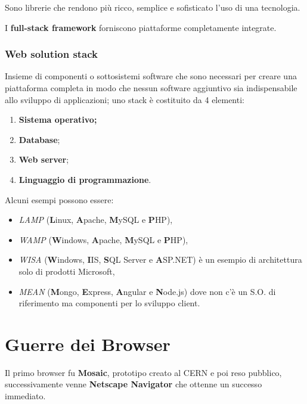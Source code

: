 Sono librerie che rendono più ricco, semplice e sofisticato l'uso di una
tecnologia.

I \textbf{full-stack framework} forniscono piattaforme completamente
integrate.

\subsubsection{Web solution stack}\label{web-solution-stack}

Insieme di componenti o sottosistemi software che sono necessari per
creare una piattaforma completa in modo che nessun software aggiuntivo
sia indispensabile allo sviluppo di applicazioni; uno stack è costituito
da 4 elementi:

\begin{enumerate}
\def\labelenumi{\arabic{enumi}.}
\item
  \textbf{Sistema operativo;}
\item
  \textbf{Database};
\item
  \textbf{Web server};
\item
  \textbf{Linguaggio di programmazione}.
\end{enumerate}

Alcuni esempi possono essere:

\begin{itemize}
\item
  \emph{LAMP} (\textbf{L}inux, \textbf{A}pache, \textbf{M}ySQL e
  \textbf{P}HP),
\item
  \emph{WAMP} (\textbf{W}indows, \textbf{A}pache, \textbf{M}ySQL e
  \textbf{P}HP),
\item
  \emph{WISA} (\textbf{W}indows, \textbf{I}IS, \textbf{S}QL Server e
  \textbf{A}SP.NET) è un esempio di architettura solo di prodotti
  Microsoft,
\item
  \emph{MEAN} (\textbf{M}ongo, \textbf{E}xpress, \textbf{A}ngular e
  \textbf{N}ode.js) dove non c'è un S.O. di riferimento ma componenti
  per lo sviluppo client.
\end{itemize}

\section{Guerre dei Browser}\label{guerre-dei-browser}

Il primo browser fu \textbf{Mosaic}, prototipo creato al CERN e poi reso
pubblico, successivamente venne \textbf{Netscape Navigator} che ottenne
un successo immediato.

